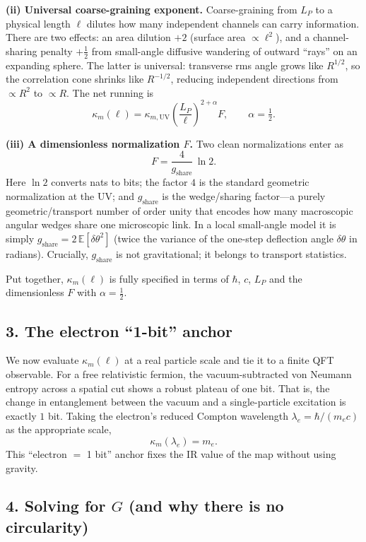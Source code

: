 \documentclass[11pt]{article}
\begin{document}
\textbf{(ii) Universal coarse-graining exponent.} Coarse-graining from $L_P$ to a physical length $\ell$ dilutes how many independent channels can carry information. There are two effects: an area dilution $+2$ (surface area $\propto \ell^2$), and a channel-sharing penalty $+\tfrac12$ from small-angle diffusive wandering of outward “rays” on an expanding sphere. The latter is universal: transverse rms angle grows like $R^{1/2}$, so the correlation cone shrinks like $R^{-1/2}$, reducing independent directions from $\propto R^2$ to $\propto R$. The net running is
\[
\kappa_m(\ell)=\kappa_{m,\mathrm{UV}}\left(\frac{L_P}{\ell}\right)^{2+\alpha}F,\qquad \alpha=\tfrac12.
\]

\textbf{(iii) A dimensionless normalization $F$.} Two clean normalizations enter as
\[
F=\frac{4}{g_{\mathrm{share}}}\,\ln 2.
\]
Here $\ln 2$ converts nats to bits; the factor $4$ is the standard geometric normalization at the UV; and $g_{\mathrm{share}}$ is the wedge/sharing factor—a purely geometric/transport number of order unity that encodes how many macroscopic angular wedges share one microscopic link. In a local small-angle model it is simply $g_{\mathrm{share}}=2\,\mathbb{E}[\delta\theta^2]$ (twice the variance of the one-step deflection angle $\delta\theta$ in radians). Crucially, $g_{\mathrm{share}}$ is not gravitational; it belongs to transport statistics.

Put together, $\kappa_m(\ell)$ is fully specified in terms of $\hbar$, $c$, $L_P$ and the dimensionless $F$ with $\alpha=\tfrac12$.

\subsection*{3. The electron “1-bit” anchor}

We now evaluate $\kappa_m(\ell)$ at a real particle scale and tie it to a finite QFT observable. For a free relativistic fermion, the vacuum-subtracted von Neumann entropy across a spatial cut shows a robust plateau of one bit. That is, the change in entanglement between the vacuum and a single-particle excitation is exactly $1$ bit. Taking the electron’s reduced Compton wavelength $\lambda_e=\hbar/(m_e c)$ as the appropriate scale,
\[
\kappa_m(\lambda_e)=m_e.
\]
This “electron $=$ 1 bit” anchor fixes the IR value of the map without using gravity.

\subsection*{4. Solving for $G$ (and why there is no circularity)}
\end{document}
